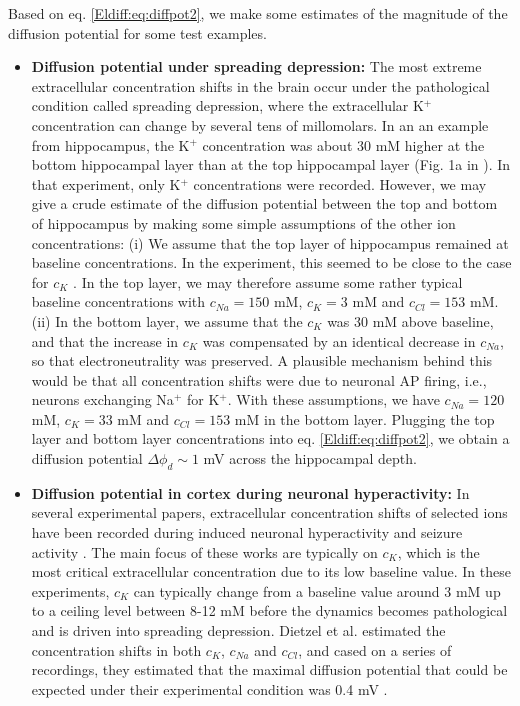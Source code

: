 Based on eq. \ref{Eldiff:eq:diffpot2}, we make some estimates of the magnitude of the diffusion potential for some test examples.

\begin{itemize}

\item {\bf Diffusion potential under spreading depression:} The most extreme extracellular concentration shifts in the brain occur under the pathological condition called spreading depression, where the extracellular K$^+$ concentration can change by several tens of millomolars. In an an example from hippocampus, the K$^+$ concentration was about 30 mM higher at the bottom hippocampal layer than at the top hippocampal layer (Fig. 1a in \citep{Herreras1993}). In that experiment, only K$^+$ concentrations were recorded. However, we may give a crude estimate of the diffusion potential between the top and bottom of hippocampus by making some simple assumptions of the other ion concentrations: (i) We assume that the top layer of hippocampus remained at baseline concentrations. In the experiment, this seemed to be close to the case for $c_K$ \citep{Herreras1993}. In the top layer, we may therefore assume some rather typical baseline concentrations with $c_{Na} = 150$ mM, $c_{K} = 3$ mM and $c_{Cl} = 153$ mM. (ii) In the bottom layer, we assume that the $c_K$ was 30 mM above baseline, and that the increase in $c_K$ was compensated by an identical decrease in $c_{Na}$, so that electroneutrality was preserved. A plausible mechanism behind this would be that all concentration shifts were due to neuronal AP firing, i.e., neurons exchanging Na$^+$ for K$^+$. With these assumptions, we have $c_{Na} = 120$ mM, $c_{K} = 33$ mM and $c_{Cl} = 153$ mM in the bottom layer. Plugging the top layer and bottom layer concentrations into eq. \ref{Eldiff:eq:diffpot2}, we obtain a diffusion potential $\Delta \phi_d \sim 1$ mV across the hippocampal depth.

\item {\bf Diffusion potential in cortex during neuronal hyperactivity:} In several experimental papers, extracellular concentration shifts of selected ions have been recorded during induced neuronal hyperactivity and seizure activity \citep{kriv1975, nicholson1978, Dietzel1982, somjen1986, Dietzel1989}. The main focus of these works are typically on $c_K$, which is the most critical extracellular concentration due to its low baseline value. In these experiments, $c_K$ can typically change from a baseline value around 3 mM up to a ceiling level between 8-12 mM before the dynamics becomes pathological and is driven into spreading depression. Dietzel et al. estimated the concentration shifts in both $c_{K}$, $c_{Na}$ and $c_{Cl}$, and cased on a series of recordings, they estimated that the maximal diffusion potential that could be expected under their experimental condition was 0.4 mV \citep{Dietzel1989}.


\end{itemize}
